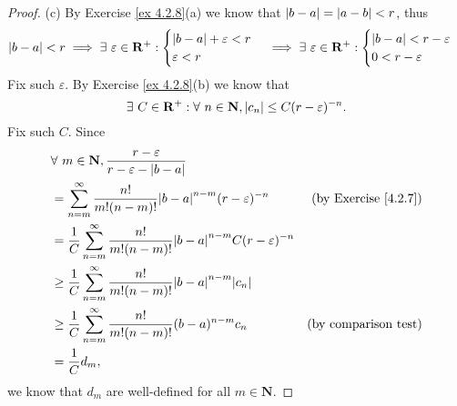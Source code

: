 \begin{proof}{(c)}
    By Exercise \ref{ex 4.2.8}(a) we know that \(\abs*{b - a} = \abs*{a - b} < r\), thus
    \[
        \abs*{b - a} < r \implies \exists\ \varepsilon \in \mathbf{R}^+ : \begin{cases}
            \abs*{b - a} + \varepsilon < r \\
            \varepsilon < r
        \end{cases} \implies \exists\ \varepsilon \in \mathbf{R}^+ : \begin{cases}
            \abs*{b - a} < r - \varepsilon \\
            0 < r - \varepsilon
        \end{cases}
    \]
    Fix such \(\varepsilon\).
    By Exercise \ref{ex 4.2.8}(b) we know that
    \[
        \exists\ C \in \mathbf{R}^+ : \forall\ n \in \mathbf{N}, \abs*{c_n} \leq C (r - \varepsilon)^{-n}.
    \]
    Fix such \(C\).
    Since
    \begin{align*}
         & \forall\ m \in \mathbf{N}, \frac{r - \varepsilon}{r - \varepsilon - \abs*{b - a}}                                                         \\
         & = \sum_{n = m}^\infty \frac{n!}{m! (n - m)!} \abs*{b - a}^{n - m} (r - \varepsilon)^{-n}               & \text{(by Exercise \ref{4.2.7})} \\
         & = \frac{1}{C} \sum_{n = m}^\infty \frac{n!}{m! (n - m)!} \abs*{b - a}^{n - m} C (r - \varepsilon)^{-n}                                    \\
         & \geq \frac{1}{C} \sum_{n = m}^\infty \frac{n!}{m! (n - m)!} \abs*{b - a}^{n - m} \abs*{c_n}                                               \\
         & \geq \frac{1}{C} \sum_{n = m}^\infty \frac{n!}{m! (n - m)!} (b - a)^{n - m} c_n                        & \text{(by comparison test)}      \\
         & = \frac{1}{C} d_m,
    \end{align*}
    we know that \(d_m\) are well-defined for all \(m \in \mathbf{N}\).
\end{proof}